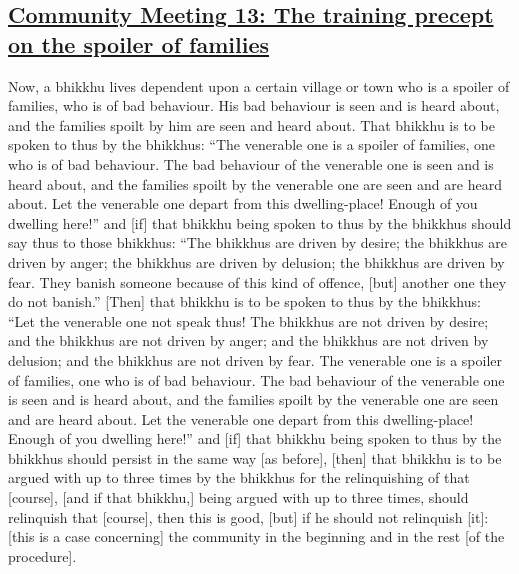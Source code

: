 \subsection*{\hyperref[sd13]{Community Meeting 13: The training precept on the spoiler of families}}
\label{comm13}
Now, a bhikkhu lives dependent upon a certain village or town who is a spoiler of families, who is of bad behaviour. His bad behaviour is seen and is heard about, and the families spoilt by him are seen and heard about. That bhikkhu is to be spoken to thus by the bhikkhus: ``The venerable one is a spoiler of families, one who is of bad behaviour. The bad behaviour of the venerable one is seen and is heard about, and the families spoilt by the venerable one are seen and are heard about. Let the venerable one depart from this dwelling-place! Enough of you dwelling here!'' and [if] that bhikkhu being spoken to thus by the bhikkhus should say thus to those bhikkhus: ``The bhikkhus are driven by desire; the bhikkhus are driven by anger; the bhikkhus are driven by delusion; the bhikkhus are driven by fear. They banish someone because of this kind of offence, [but] another one they do not banish.'' [Then] that bhikkhu is to be spoken to thus by the bhikkhus: ``Let the venerable one not speak thus! The bhikkhus are not driven by desire; and the bhikkhus are not driven by anger; and the bhikkhus are not driven by delusion; and the bhikkhus are not driven by fear. The venerable one is a spoiler of families, one who is of bad behaviour. The bad behaviour of the venerable one is seen and is heard about, and the families spoilt by the venerable one are seen and are heard about. Let the venerable one depart from this dwelling-place! Enough of you dwelling here!'' and [if] that bhikkhu being spoken to thus by the bhikkhus should persist in the same way [as before], [then] that bhikkhu is to be argued with up to three times by the bhikkhus for the relinquishing of that [course], [and if that bhikkhu,] being argued with up to three times, should relinquish that [course], then this is good, [but] if he should not relinquish [it]: [this is a case concerning] the community in the beginning and in the rest [of the procedure].

\medskip

